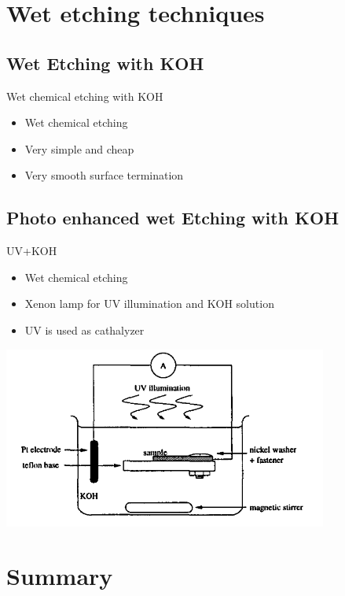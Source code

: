 \documentclass{beamer}
\begin{document}
\section{Wet etching techniques}

\subsection{Wet Etching with KOH}
\begin{frame}{Wet chemical etching with KOH}

    \begin{itemize}
    \item
Wet chemical etching
 \pause
    \item
Very simple and cheap
    \item
Very smooth surface termination
\end{itemize}
\end{frame}


\subsection{Photo enhanced wet Etching with KOH}
\begin{frame}{UV+KOH}

    \begin{itemize}
    \item
Wet chemical etching
 \pause
    \item
Xenon lamp for UV illumination and KOH solution
    \item
UV is used as cathalyzer

\end{itemize}
\begin{center}
\includegraphics[width=0.8\textwidth]{koh.png}
\end{center}

\end{frame}


\section*{Summary}
\end{document}
